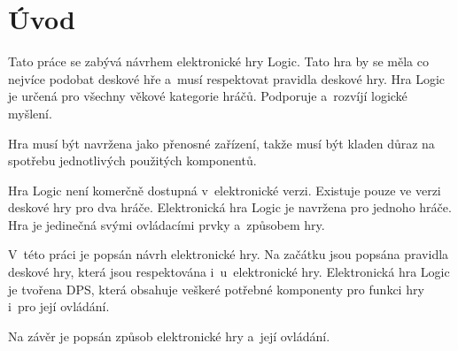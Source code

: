 \chapter*{Úvod}
{}

Tato práce se zabývá návrhem elektronické hry Logic. Tato hra by se měla co nejvíce podobat deskové hře a~musí respektovat pravidla deskové 
hry. Hra Logic je určená pro všechny věkové kategorie hráčů. Podporuje a~rozvíjí logické myšlení. 

Hra musí být navržena jako přenosné zařízení, takže musí být kladen důraz na spotřebu jednotlivých použitých komponentů.

Hra Logic není komerčně dostupná v~elektronické verzi. Existuje pouze ve verzi deskové hry pro dva hráče. Elektronická hra Logic je 
navržena pro jednoho hráče. Hra je jedinečná svými ovládacími prvky a~způsobem hry. 

V~této práci je popsán návrh elektronické hry. Na začátku jsou popsána pravidla deskové hry, která jsou respektována i~u~elektronické hry. 
Elektronická hra Logic je tvořena DPS, která obsahuje veškeré potřebné komponenty pro funkci hry i~pro její ovládání.

Na závěr je popsán způsob elektronické hry a~její ovládání.




